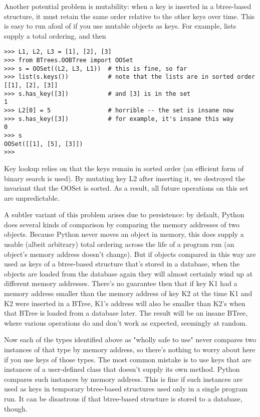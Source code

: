 Another potential problem is mutability:  when a key is inserted in a
btree-based structure, it must retain the same order relative to the
other keys over time.  This is easy to run afoul of if you use mutable
objects as keys.  For example, lists supply a total ordering, and then

\begin{verbatim}
>>> L1, L2, L3 = [1], [2], [3]
>>> from BTrees.OOBTree import OOSet
>>> s = OOSet((L2, L3, L1))  # this is fine, so far
>>> list(s.keys())           # note that the lists are in sorted order
[[1], [2], [3]]
>>> s.has_key([3])           # and [3] is in the set
1
>>> L2[0] = 5                # horrible -- the set is insane now
>>> s.has_key([3])           # for example, it's insane this way
0
>>> s
OOSet([[1], [5], [3]])
>>>
\end{verbatim}

Key lookup relies on that the keys remain in sorted order (an efficient
form of binary search is used).  By mutating key L2 after inserting it,
we destroyed the invariant that the OOSet is sorted.  As a result, all
future operations on this set are unpredictable.

A subtler variant of this problem arises due to persistence:  by default,
Python does several kinds of comparison by comparing the memory
addresses of two objects.  Because Python never moves an object in memory,
this does supply a usable (albeit arbitrary) total ordering across the
life of a program run (an object's memory address doesn't change).  But
if objects compared in this way are used as keys of a btree-based
structure that's stored in a database, when the objects are loaded from
the database again they will almost certainly wind up at different
memory addresses.  There's no guarantee then that if key K1 had a memory
address smaller than the memory address of key K2 at the time K1 and
K2 were inserted in a BTree, K1's address will also be smaller than
K2's when that BTree is loaded from a database later.  The result will
be an insane BTree, where various operations do and don't work as
expected, seemingly at random.

Now each of the types identified above as "wholly safe to use" never
compares two instances of that type by memory address, so there's
nothing to worry about here if you use keys of those types.  The most
common mistake is to use keys that are instances of a user-defined class
that doesn't supply its own  method.  Python compares
such instances by memory address.  This is fine if such instances are
used as keys in temporary btree-based structures used only in a single
program run.  It can be disastrous if that btree-based structure is
stored to a database, though.

